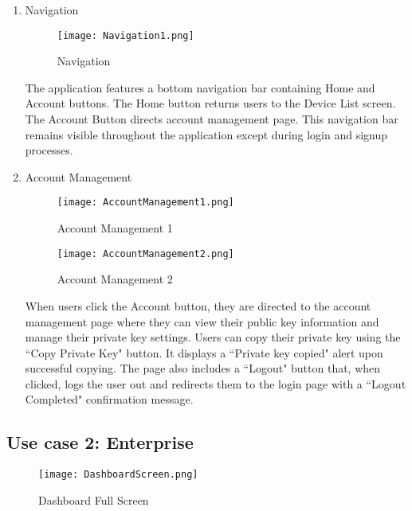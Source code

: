 \documentclass[conference]{IEEEtran}
\begin{document}
\begin{enumerate}[itemsep=2ex, parsep=1ex]
	\item{Navigation}

    \begin{figure}[h!]
        \centering
        \texttt{[image: Navigation1.png]}
        \caption{Navigation}
        \label{fig:enter-label}
    \end{figure}
	        
	The application features a bottom navigation bar containing Home and Account buttons. The Home button returns users to the Device List screen. The Account Button directs account management page. This navigation bar remains visible throughout the application except during login and signup processes.
	        
	\item{Account Management}

    \begin{figure}[h!]
        \centering
        \texttt{[image: AccountManagement1.png]}
        \caption{Account Management 1}
        \label{fig:enter-label}
    \end{figure}

    \begin{figure}[h!]
        \centering
        \texttt{[image: AccountManagement2.png]}
        \caption{Account Management 2}
        \label{fig:enter-label}
    \end{figure}
	        
	When users click the Account button, they are directed to the account management page where they can view their public key information and manage their private key settings. Users can copy their private key using the ``Copy Private Key" button. It displays a ``Private key copied" alert upon successful copying. The page also includes a ``Logout" button that, when clicked, logs the user out and redirects them to the login page with a ``Logout Completed" confirmation message.
\end{enumerate}

\subsection{Use case 2: Enterprise}
    
\begin{figure}[h!]
	\centering
	\texttt{[image: DashboardScreen.png]}
	\caption{Dashboard Full Screen}
	\label{fig:Dashboard_full}
\end{figure}
    
\end{document}
